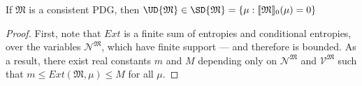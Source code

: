 \documentclass{article}
\newcommand{\dg}[1]{\mathfrak{#1}}
\def\extrsymb{\mathit{Ext}}
\newcommand{\V}{\mathcal V}
\newcommand{\N}{\mathcal N}
\begin{document}
    \begin{prop}\label{prop:consist}
    	If $\dg M$ is a consistent PDG, then $\UD{\dg M} \in \SD{\dg M} = \{ \mu : \bbr{\dg M}_0(\mu) = 0 \}$
    \end{prop}
    \begin{proof}
        \def\lb{m}
        \def\ub{M}    
        First, note that $\extrsymb$ is a finite sum of entropies and conditional entropies, over the variables $\N^{\dg M}$, which have finite support --- and therefore is bounded. As a result, there exist real constants $\lb$ and $\ub$ depending only on $\N^{\dg M}$ and $\V^{\dg M}$ such that $\lb \leq \extrsymb(\dg M, \mu) \leq \ub$ for all $\mu$.


\end{proof}
\end{document}
